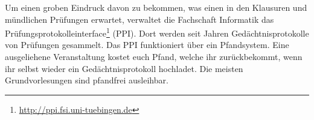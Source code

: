 Um einen groben Eindruck davon zu bekommen, was einen in den Klausuren und mündlichen Prüfungen erwartet, verwaltet die Fachschaft Informatik das Pr\"ufungsprotokolleinterface\footnote{\url{http://ppi.fsi.uni-tuebingen.de}} (PPI). Dort werden seit Jahren Ged\"achtnisprotokolle von Prüfungen gesammelt. Das PPI funktioniert über ein Pfandsystem. Eine ausgeliehene Veranstaltung kostet euch  Pfand, welche ihr zur\"uckbekommt, wenn ihr selbst wieder ein Gedächtnisprotokoll hochladet. Die meisten Grundvorlesungen sind pfandfrei ausleihbar.
\vfill
